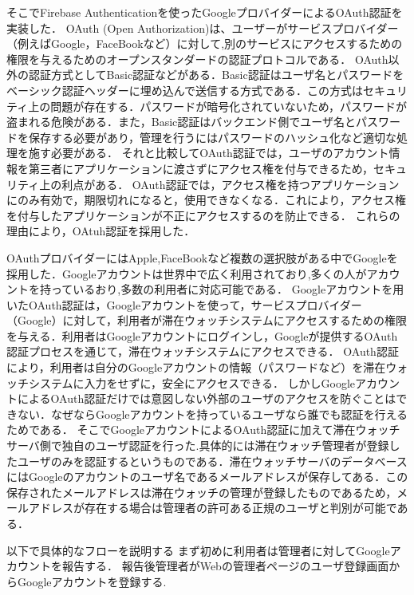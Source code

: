 そこでFirebase Authenticationを使ったGoogleプロバイダーによるOAuth認証を実装した．
OAuth (Open Authorization)は、ユーザーがサービスプロバイダー（例えばGoogle，FaceBookなど）に対して,別のサービスにアクセスするための権限を与えるためのオープンスタンダードの認証プロトコルである．
OAuth以外の認証方式としてBasic認証などがある．Basic認証はユーザ名とパスワードをベーシック認証ヘッダーに埋め込んで送信する方式である．この方式はセキュリティ上の問題が存在する．パスワードが暗号化されていないため，パスワードが盗まれる危険がある．また，Basic認証はバックエンド側でユーザ名とパスワードを保存する必要があり，管理を行うにはパスワードのハッシュ化など適切な処理を施す必要がある．
それと比較してOAuth認証では，ユーザのアカウント情報を第三者にアプリケーションに渡さずにアクセス権を付与できるため，セキュリティ上の利点がある．
OAuth認証では，アクセス権を持つアプリケーションにのみ有効で，期限切れになると，使用できなくなる．これにより，アクセス権を付与したアプリケーションが不正にアクセスするのを防止できる．
これらの理由により，OAtuh認証を採用した．

OAuthプロバイダーにはApple,FaceBookなど複数の選択肢がある中でGoogleを採用した．Googleアカウントは世界中で広く利用されており,多くの人がアカウントを持っているおり,多数の利用者に対応可能である．
Googleアカウントを用いたOAuth認証は，Googleアカウントを使って，サービスプロバイダー（Google）に対して，利用者が滞在ウォッチシステムにアクセスするための権限を与える．利用者はGoogleアカウントにログインし，Googleが提供するOAuth認証プロセスを通じて，滞在ウォッチシステムにアクセスできる．
OAuth認証により，利用者は自分のGoogleアカウントの情報（パスワードなど）を滞在ウォッチシステムに入力をせずに，安全にアクセスできる．
しかしGoogleアカウントによるOAuth認証だけでは意図しない外部のユーザのアクセスを防ぐことはできない．なぜならGoogleアカウントを持っているユーザなら誰でも認証を行えるためである．
そこでGoogleアカウントによるOAuth認証に加えて滞在ウォッチサーバ側で独自のユーザ認証を行った.具体的には滞在ウォッチ管理者が登録したユーザのみを認証するというものである．滞在ウォッチサーバのデータベースにはGoogleのアカウントのユーザ名であるメールアドレスが保存してある．この保存されたメールアドレスは滞在ウォッチの管理が登録したものであるため，メールアドレスが存在する場合は管理者の許可ある正規のユーザと判別が可能である．

以下で具体的なフローを説明する
まず初めに利用者は管理者に対してGoogleアカウントを報告する．
報告後管理者がWebの管理者ページのユーザ登録画面からGoogleアカウントを登録する.

